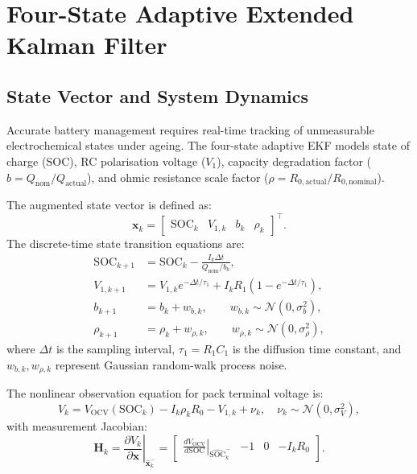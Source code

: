 \section{Four-State Adaptive Extended Kalman Filter}
\label{sec:ch5_estimator}

\subsection{State Vector and System Dynamics}
\label{subsec:ch5_state_dynamics}

Accurate battery management requires real-time tracking of unmeasurable electrochemical states under ageing. The four-state adaptive EKF models state of charge ($\mathrm{SOC}$), RC polarisation voltage ($V_1$), capacity degradation factor ($b = Q_{\mathrm{nom}} / Q_{\mathrm{actual}}$), and ohmic resistance scale factor ($\rho = R_{0,\mathrm{actual}} / R_{0,\mathrm{nominal}}$).

The augmented state vector is defined as:
\begin{equation}
  \mathbf{x}_k = \begin{bmatrix} \mathrm{SOC}_k & V_{1,k} & b_k & \rho_k \end{bmatrix}^\top.
\end{equation}
The discrete-time state transition equations are:
\begin{align}
  \mathrm{SOC}_{k+1} &= \mathrm{SOC}_k - \frac{I_k \Delta t}{Q_{\mathrm{nom}} / b_k}, \\
  V_{1,k+1} &= V_{1,k} e^{-\Delta t/\tau_1} + I_k R_1 \left(1 - e^{-\Delta t/\tau_1}\right), \\
  b_{k+1} &= b_k + w_{b,k}, \qquad w_{b,k} \sim \mathcal{N}(0, \sigma_b^2), \\
  \rho_{k+1} &= \rho_k + w_{\rho,k}, \qquad w_{\rho,k} \sim \mathcal{N}(0, \sigma_\rho^2),
\end{align}
where $\Delta t$ is the sampling interval, $\tau_1 = R_1 C_1$ is the diffusion time constant, and $w_{b,k}, w_{\rho,k}$ represent Gaussian random-walk process noise.

The nonlinear observation equation for pack terminal voltage is:
\begin{equation}
  V_k = V_{\mathrm{OCV}}(\mathrm{SOC}_k) - I_k \rho_k R_0 - V_{1,k} + \nu_k, \quad \nu_k \sim \mathcal{N}(0, \sigma_V^2),
\end{equation}
with measurement Jacobian:
\begin{equation}
  \mathbf{H}_k = \left. \frac{\partial V_k}{\partial \mathbf{x}} \right|_{\hat{\mathbf{x}}_k^-} = \begin{bmatrix} \left.\frac{d V_{\mathrm{OCV}}}{d\mathrm{SOC}}\right|_{\widehat{\mathrm{SOC}}_k^-} & -1 & 0 & -I_k R_0 \end{bmatrix}.
\end{equation}

